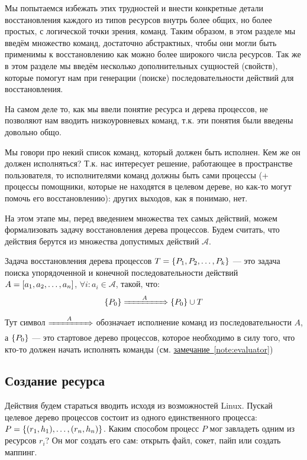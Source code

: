Мы попытаемся избежать этих трудностей и внести конкретные детали восстановления каждого из типов ресурсов внутрь более общих, но более простых, с логической точки зрения, команд. Таким образом, в этом разделе мы введём множество команд, достаточно абстрактных, чтобы они могли быть применимы к восстановлению как можно более широкого числа ресурсов. Так же в этом разделе мы введём несколько дополнительных сущностей (свойств), которые помогут нам при генерации (поиске) последовательности действий для восстановления.

На самом деле то, как мы ввели понятие ресурса и дерева процессов, не позволяют нам вводить низкоуровневых команд, т.к. эти понятия были введены довольно общо.

\begin{note}
\label{note:evaluator}
Мы говори про некий список команд, который должен быть исполнен. Кем же он должен исполняться? Т.к. нас интересует решение, работающее в пространстве пользователя, то исполнителями команд должны быть сами процессы (+ процессы помощники, которые не находятся в целевом дереве, но как-то могут помочь его восстановлению): других выходов, как я понимаю, нет.
\end{note}

На этом этапе мы, перед введением множества тех самых действий, можем формализовать задачу восстановления дерева процессов. Будем считать, что действия берутся из множества допустимых действий $\mathcal{A}$.
\begin{defn}
Задача восстановления дерева процессов $T = \left\lbrace P_1, P_2, \ldots, P_k \right\rbrace$ --- это задача поиска упорядоченной и конечной последовательности действий $A = \left[ a_1, a_2, \ldots, a_n \right]$, $\forall i: a_i \in \mathcal{A}$, такой, что:
\begin{equation*}
	\left\lbrace P_0 \right\rbrace \xRightarrow{\qquad A\qquad} \left\lbrace P_0 \right\rbrace \cup T
\end{equation*}
Тут символ $\xRightarrow{\qquad A\qquad}$ обозначает исполнение команд из последовательности $A$, а $\left\lbrace P_0 \right\rbrace$ --- это стартовое дерево процессов, которое необходимо в силу того, что кто-то должен начать исполнять команды (см. \hyperref[note:evaluator]{замечание~\ref*{note:evaluator}})
\end{defn}

\subsection{Создание ресурса}

Действия будем стараться вводить исходя из возможностей Linux. Пускай целевое дерево процессов состоит из одного единственного процесса: $P = \left\lbrace (r_1, h_1), \ldots, (r_n, h_n) \right\rbrace$. Каким способом процесс $P$ мог завладеть одним из ресурсов $r_i$? Он мог создать его сам: открыть файл, сокет, пайп или создать маппинг.

